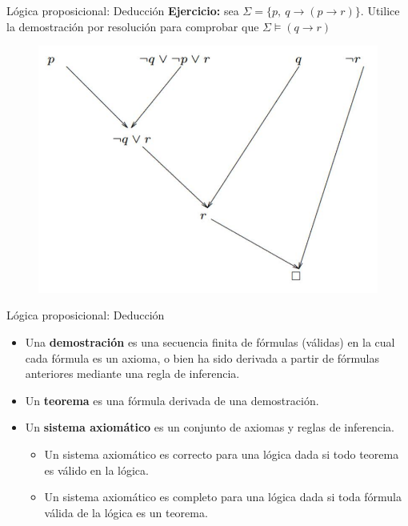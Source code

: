 \documentclass{beamer}
\begin{document}
\begin{frame}{Lógica proposicional: Deducción}
  \textbf{Ejercicio:} sea $\Sigma = \{p,\ q \rightarrow (p \rightarrow r)\}$.
  Utilice la demostración por resolución para comprobar que
  $\Sigma \vDash (q \rightarrow r)$

  \begin{figure}
    \centering
    \includegraphics[width=.8\textwidth]{images/demostracion_por_resolucion.png}
  \end{figure}
\end{frame}


\begin{frame}{Lógica proposicional: Deducción}
  \begin{itemize}
    \item Una \textbf{demostración} es una secuencia finita de fórmulas
          (válidas) en la cual cada fórmula es un axioma, o bien ha sido
          derivada a partir de fórmulas anteriores mediante una regla de
          inferencia.
    \item Un \textbf{teorema} es una fórmula derivada de una demostración.
    \item Un \textbf{sistema axiomático} es un conjunto de axiomas y reglas de
          inferencia.
          \begin{itemize}
            \item Un sistema axiomático es correcto para una lógica dada si todo
                  teorema es válido en la lógica.
            \item Un sistema axiomático es completo para una lógica dada si toda
                  fórmula válida de la lógica es un teorema.
          \end{itemize}


  \end{itemize}
\end{frame}
\end{document}
